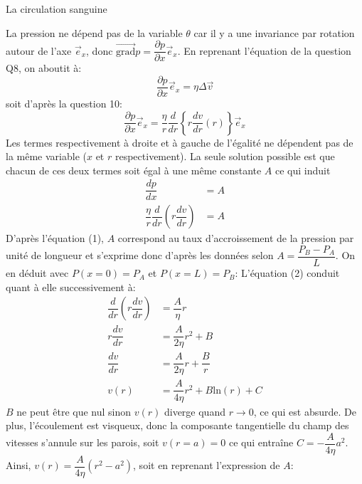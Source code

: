 \begin{exo}[PC][1][devoir]{La circulation sanguine}
\begin{quest}
{  }
  {
  La pression ne dépend pas de la variable $\theta$ car il y a une invariance par rotation autour de l'axe
  $\overrightarrow{e}_{x}$, donc $\overrightarrow{\mathrm{grad}} p = \dfrac{\partial p}{\partial x} \overrightarrow{e}_{x}$. En reprenant l'équation de la question Q8, on aboutit à:
  \begin{equation*}
  \dfrac{\partial p}{\partial x} \overrightarrow{e}_{x} = \eta \Delta \overrightarrow{v}
  \end{equation*}
  soit d'après la question 10:
  \begin{equation*}
  \dfrac{\partial p}{\partial x} \overrightarrow{e}_{x} = \dfrac{\eta}{r} \dfrac{d}{dr} \left\lbrace r\dfrac{dv}{dr}(r) \right\rbrace \overrightarrow{e}_{x}
  \end{equation*}
  Les termes respectivement à droite et à gauche de l'égalité ne dépendent pas de la même variable ($x$ et $r$ respectivement). La seule solution possible est que chacun de ces deux termes soit égal à une même constante $A$ ce qui induit
  \begin{align}
  \dfrac{dp}{dx}&=A \\
  \dfrac{\eta}{r}\dfrac{d}{dr}\left( r \dfrac{dv}{dr}\right)&=A
  \end{align}
  D'après l'équation (1), $A$ correspond au taux d'accroissement de la pression par unité de longueur et s'exprime donc d'après les données selon $A=\dfrac{P_{B}-P_{A}}{L}$. On en déduit avec $P(x=0)=P_{A}$ et $P(x=L)=P_{B}$:
  L'équation (2) conduit quant à elle successivement à:
  \begin{align*}
  \dfrac{d}{dr}\left( r \dfrac{dv}{dr}\right)&=\dfrac{A}{\eta}r\\
  r \dfrac{dv}{dr}&=\dfrac{A}{2\eta}r^{2}+B\\
  \dfrac{dv}{dr}&=\dfrac{A}{2\eta}r+\dfrac{B}{r}\\
  v(r)&=\dfrac{A}{4\eta}r^{2}+B\mathrm{ln}(r)+C
  \end{align*}
  $B$ ne peut être que nul sinon $v(r)$ diverge quand $r\rightarrow 0$, ce qui est absurde. De plus, l'écoulement est visqueux, donc la composante tangentielle du champ des vitesses s'annule sur les parois, soit $v(r=a)=0$ ce qui entraîne $C=-\dfrac{A}{4\eta} a^{2}$. Ainsi, $v(r)=\dfrac{A}{4\eta}\left( r^{2}-a^{2}\right) $, soit en reprenant l'expression de $A$:
  }


\end{quest}
\end{exo}
